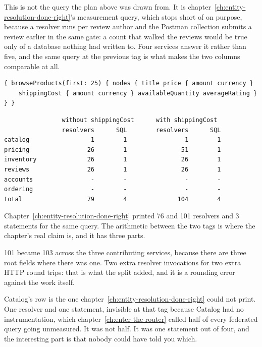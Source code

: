 This is not the query the plan above was drawn from. It is
chapter~\ref{ch:entity-resolution-done-right}'s measurement query, which stops
short of  on purpose, because a resolver runs per review
author and the Postman collection submits a review earlier in the same gate: a
count that walked the reviews would be true only of a database nothing had
written to. Four services answer it rather than five, and the same query at the
previous tag is what makes the two columns comparable at all.

\begin{verbatim}
{ browseProducts(first: 25) { nodes { title price { amount currency }
    shippingCost { amount currency } availableQuantity averageRating } } }
\end{verbatim}

\begin{verbatim}
                without shippingCost      with shippingCost
                resolvers      SQL        resolvers      SQL
catalog                 1        1                1        1
pricing                26        1               51        1
inventory              26        1               26        1
reviews                26        1               26        1
accounts                -        -                -        -
ordering                -        -                -        -
total                  79        4              104        4
\end{verbatim}

Chapter~\ref{ch:entity-resolution-done-right} printed 76 and 101 resolvers and 3
statements for the same query. The arithmetic between the two tags is where the
chapter's real claim is, and it has three parts.

%
101 became 103 across the three contributing services, because there are three
 root fields where there was one. Two extra resolver
invocations for two extra HTTP round trips: that is what the split added, and it
is a rounding error against the work itself.

Catalog's row is the one chapter~\ref{ch:entity-resolution-done-right} could not
print. One resolver and one statement, invisible at that tag because Catalog had
no instrumentation, which chapter~\ref{ch:enter-the-router} called half of every
federated query going unmeasured. It was not half. It was one statement out of
four, and the interesting part is that nobody could have told you which.

